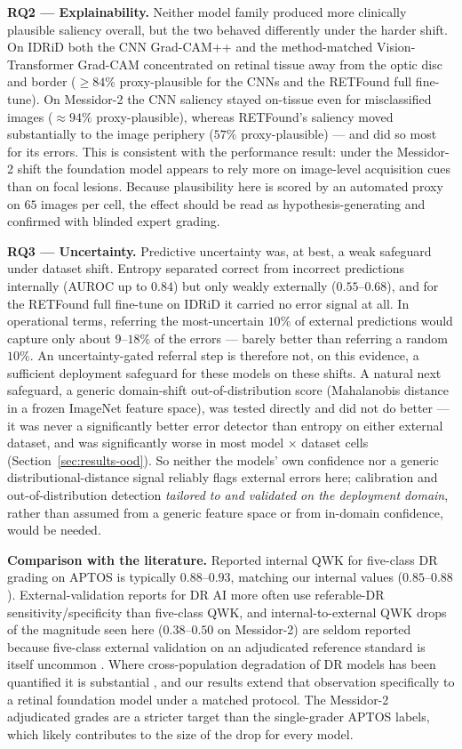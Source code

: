 \documentclass[journal]{IEEEtran}
\renewcommand{\_}{\origunderscore\allowbreak}
\begin{document}
\textbf{RQ2 --- Explainability.} Neither model family produced more clinically
plausible saliency overall, but the two behaved differently under the harder
shift. On IDRiD both the CNN Grad-CAM++ and the method-matched Vision-Transformer
Grad-CAM concentrated on retinal tissue away from the optic disc and border
($\geq 84\%$ proxy-plausible for the CNNs and the RETFound full fine-tune). On
Messidor-2 the CNN saliency stayed on-tissue even for misclassified images
($\approx 94\%$ proxy-plausible), whereas RETFound's saliency moved substantially
to the image periphery ($57\%$ proxy-plausible) --- and did so most for its
errors. This is consistent with the performance result: under the Messidor-2
shift the foundation model appears to rely more on image-level acquisition cues
than on focal lesions. Because plausibility here is scored by an automated proxy
on $65$ images per cell, the effect should be read as hypothesis-generating and
confirmed with blinded expert grading.

\textbf{RQ3 --- Uncertainty.} Predictive uncertainty was, at best, a weak
safeguard under dataset shift. Entropy separated correct from incorrect
predictions internally (AUROC up to $0.84$) but only weakly externally
($0.55$--$0.68$), and for the RETFound full fine-tune on IDRiD it carried no error
signal at all. In operational terms, referring the most-uncertain $10\%$ of
external predictions would capture only about $9$--$18\%$ of the errors --- barely
better than referring a random $10\%$. An uncertainty-gated referral step is
therefore not, on this evidence, a sufficient deployment safeguard for these
models on these shifts. A natural next safeguard, a generic domain-shift
out-of-distribution score (Mahalanobis distance in a frozen ImageNet feature
space), was tested directly and did not do better --- it was never a
significantly better error detector than entropy on either external dataset,
and was significantly worse in most model $\times$ dataset cells
(Section~\ref{sec:results-ood}). So neither the models' own confidence nor a
generic distributional-distance signal reliably flags external errors here;
calibration and out-of-distribution detection \emph{tailored to and validated
on the deployment domain}, rather than assumed from a generic feature space or
from in-domain confidence, would be needed.

\textbf{Comparison with the literature.} Reported internal QWK for five-class DR
grading on APTOS is typically $0.88$--$0.93$, matching our internal values
($0.85$--$0.88$). External-validation reports for DR AI more often use
referable-DR sensitivity/specificity than five-class QWK, and
internal-to-external QWK drops of the magnitude seen here ($0.38$--$0.50$ on
Messidor-2) are seldom reported because five-class external validation on an
adjudicated reference standard is itself uncommon \cite{grzybowski2020review}.
Where cross-population degradation of DR models has been quantified it is
substantial \cite{dai2021spectrum,beede2020}, and our results extend that
observation specifically to a retinal foundation model under a matched protocol.
The Messidor-2 adjudicated grades \cite{krause2018} are a stricter target than the
single-grader APTOS labels, which likely contributes to the size of the drop for
every model.
\end{document}
